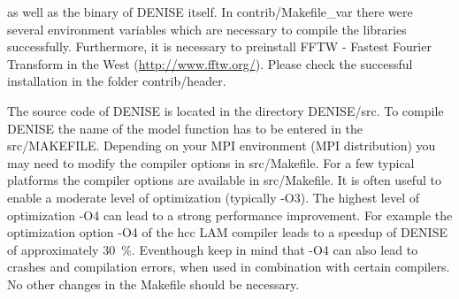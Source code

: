 {\color{blue}{\begin{verbatim}
lib cseife
lib stfinv
lib aff
lib fourier
\end{verbatim}}}
as well as the binary of DENISE itself.
In contrib/Makefile\_var there were several environment variables which are necessary to compile the libraries successfully. Furthermore, it is necessary to preinstall FFTW - Fastest Fourier Transform in the West (\href{http://www.fftw.org/}{http://www.fftw.org/}). Please check the successful installation in the folder contrib/header.
\newline
  
The source code of DENISE is located in the directory DENISE/src. To compile DENISE the name of the model function has to be entered in the src/MAKEFILE. Depending on your MPI environment (MPI distribution) you may need to modify the compiler options in src/Makefile. For a few typical platforms the compiler options are available in src/Makefile. It is often useful to enable a moderate level of optimization (typically -O3). The highest level of optimization -O4 can lead to a strong performance improvement. For example the optimization option -O4 of the hcc LAM compiler leads to a speedup of DENISE of approximately 30~\%. Eventhough keep in mind that -O4 can also lead to crashes and compilation errors, when used in combination with certain compilers. No other changes in the Makefile should be necessary. 
{\color{blue}{\begin{verbatim}
# Makefile for DENISE

#--------------------------------------------------------
# edit here:

# source code for model generation

MODEL_EL = half_space.c
EXEC= ../bin


# Compiler (LAM: CC=hcc, CRAY T3E: CC=cc)

# ON Linux cluster running LAM (options for DENISE)
#CC=hcc
#LFLAGS=-lm -lmpi -lcseife 
#CFLAGS=-O3 
#SFLAGS=-L./../libcseife
#IFLAGS=-I./../libcseife

# On CRAY T3E
# CC=cc

# On MARWIN
CC=mpicc
LFLAGS=-lm -lcseife
CFLAGS=-O3
SFLAGS=-L./../libcseife
IFLAGS=-I./../libcseife

# On HLRN system
#CC=mpcc
#LFLAGS=-lm  

# ALTIX
#CC=icc
#CFLAGS=-mp -O3 -ipo
#LFLAGS=-lmpi -lm -i-static

# On the workstations in Karlsruhe (GPI)
CC=mpicc
LFLAGS=-lm -lcseife -lstfinv -laff -lfourierxx -lfftw3 -lstdc++
CFLAGS=-O3
SFLAGS=-L./../libcseife -L./../contrib/bin
IFLAGS=-I./../libcseife -I./../contrib/header

# after this line, no further editing should be necessary
# --------------------------------------------------------
\end{verbatim}}} 

